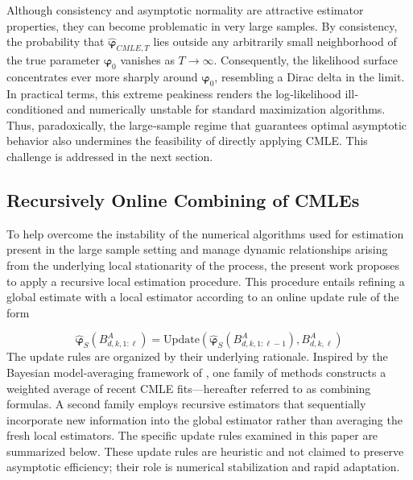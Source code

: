 \documentclass[10pt,a4paper,oneside]{article}
\begin{document}
Although consistency and asymptotic normality are attractive estimator properties, they can become problematic in very large samples.  By consistency, the probability that \(\hat{\boldsymbol{\varphi}}_{CMLE,T}\) lies outside any arbitrarily small neighborhood of the true parameter \(\boldsymbol{\varphi}_0\) vanishes as \(T\to\infty\).  Consequently, the likelihood surface concentrates ever more sharply around \(\boldsymbol{\varphi}_0\), resembling a Dirac delta in the limit.  In practical terms, this extreme peakiness renders the log‐likelihood ill‐conditioned and numerically unstable for standard maximization algorithms.  Thus, paradoxically, the large‐sample regime that guarantees optimal asymptotic behavior also undermines the feasibility of directly applying CMLE. This challenge is addressed in the next section.


\subsection{Recursively Online Combining of CMLEs}
\label{subsec:combining_cmles}

To help overcome the instability of the numerical algorithms used for estimation present in the large sample setting and manage dynamic relationships arising from the underlying local stationarity of the process, the present work proposes to apply a recursive local estimation procedure. This procedure entails refining a global estimate with a local estimator according to an online update rule of the form

$$
    \hat{\boldsymbol{\varphi}}_S\left( B^A_{d,k,1:\ell} \right) = \mathrm{Update}\left( \hat{\boldsymbol{\varphi}}_S\left( B^A_{d,k,1:\ell - 1} \right),  B^A_{d,k,\ell} \right)
$$
The update rules are organized by their underlying rationale.  Inspired by the Bayesian model‐averaging framework of \cite{madigan2003bayesian}, one family of methods constructs a weighted average of recent CMLE fits—hereafter referred to as combining formulas.  A second family employs recursive estimators that sequentially incorporate new information into the global estimator rather than averaging the fresh local estimators. The specific update rules examined in this paper are summarized below. These update rules are heuristic and not claimed to preserve asymptotic efficiency; their role is numerical stabilization and rapid adaptation.

\end{document}
